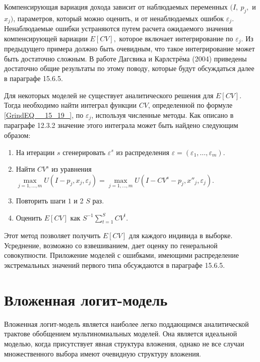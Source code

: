 Компенсирующая вариация дохода зависит от наблюдаемых переменных $(I,\ p_j,$ и $x_j)$,  параметров, который можно оценить, и от ненаблюдаемых ошибок ${\varepsilon }_j.$ Ненаблюдаемые ошибки устраняются путем расчета ожидаемого значения компенсирующей вариации $E\left[CV\right],$ которое включает интегрирование по ${\varepsilon }_j$. Из предыдущего примера должно быть очевидным, что такое интегрирование может быть достаточно сложным. В работе Дагсвика и Карлстрёма (2004) приведены достаточно общие результаты по этому поводу, которые будут обсуждаться далее в параграфе 15.6.5.

Для некоторых моделей не существует аналитического решения для $E\left[CV\right].$ Тогда необходимо найти интеграл функции $CV$, определенной по формуле \eqref{GrindEQ__15_19_}, по ${\varepsilon }_j$, используя численные методы. Как описано в параграфе 12.3.2 значение этого интеграла может быть найдено следующим образом:

\begin{enumerate}
\item  На итерации $s$ сгенерировать ${\varepsilon }^s$ из распределения $\varepsilon =\left({\varepsilon }_1,\dots ,{\varepsilon }_m\right).$

\item  Найти $CV^s$ из уравнения $\underset{j=1,\dots ,m}{\max } 
U\left(I-p_j,x_j,{\varepsilon }_j\right)=
\underset{j=1,\dots ,m}{\max } U\left(I-CV^s-p_j,x''_j,{\varepsilon }_j\right).\ $

\item  Повторить шаги $1$ и 2 $S$ раз.

\item  Оценить $E[CV]$ как $S^{-1}\sum^S_{t=1}{CV^t}.$
\end{enumerate}

Этот метод позволяет получить $E\left[CV\right]$ для каждого индивида в выборке. Усреднение, возможно со взвешиванием, дает оценку по генеральной совокупности. Приложение моделей с ошибками, имеющими распределение экстремальных значений первого типа обсуждаются в параграфе 15.6.5.

\section{Вложенная логит-модель}

Вложенная логит-модель является наиболее легко поддающимся аналитической трактове обобщением мультиномиальных моделей. Она является идеальной моделью, когда присутствует явная структура вложения, однако не все случаи множественного выбора имеют очевидную структуру вложения. 

